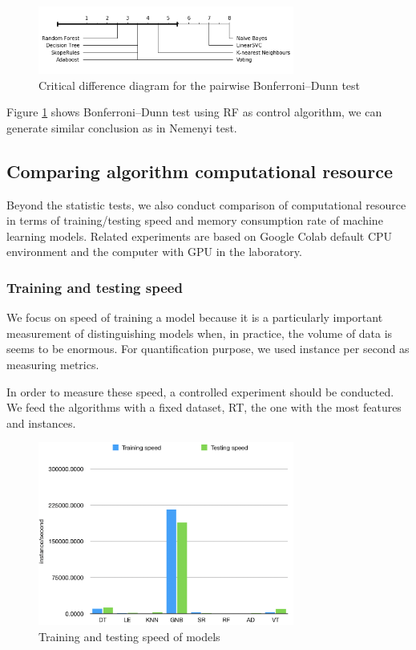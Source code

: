 \begin{figure}[h]
  \includegraphics[width=0.75\textwidth]
  {BD diagram.png}
\caption{Critical difference diagram for the pairwise Bonferroni–Dunn test}
\label{fig:BD test}       %
\end{figure}
Figure \ref{fig:BD test} shows Bonferroni–Dunn test using RF as control algorithm, we can generate similar conclusion as in Nemenyi test.

\subsection{Comparing algorithm computational resource}
Beyond the statistic tests, we also conduct comparison of computational resource in terms of training/testing speed and memory consumption rate of machine learning models. Related experiments are based on Google Colab default CPU environment and the computer with GPU in the laboratory.

\subsubsection{Training and testing speed}
We focus on speed of training a model because it is a particularly important measurement of distinguishing models when, in practice, the volume of data is seems to be enormous. For quantification purpose, we used instance per second as measuring metrics.

In order to measure these speed, a controlled experiment should be conducted. We feed the algorithms with a fixed dataset, RT, the one with the most features and instances.

\begin{figure}
  \includegraphics[width=0.75\textwidth]
  {training speed all.png}
\caption{Training and testing speed of models}
\label{fig: Training speed all}       %
\end{figure}

